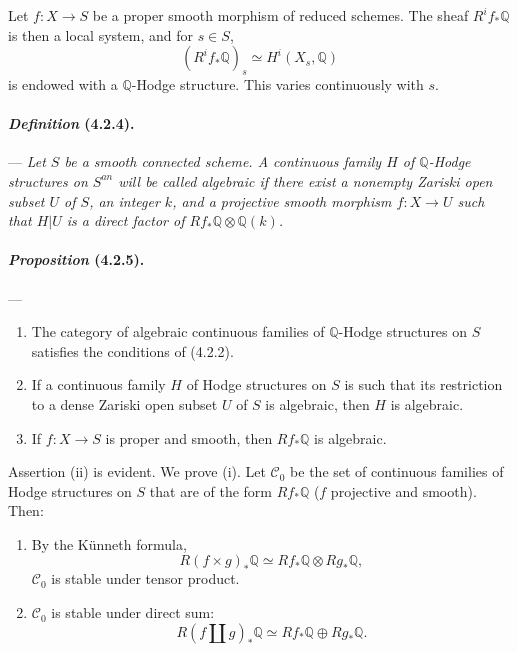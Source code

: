 \documentclass[10pt]{article}
\newcommand{\Q}{\mathbb Q}
\begin{document}
Let $f:X\to S$ be a proper smooth morphism of reduced schemes. The sheaf $R^if_*\Q$ is then a local system, and for $s\in S$,
\[
(R^if_*\Q)_s\simeq H^i(X_s,\Q)
\]
is endowed with a $\Q$-Hodge structure. This varies continuously with $s$.

\paragraph{\emph{Definition} (4.2.4).} --- {\itshape Let $S$ be a smooth connected scheme. A continuous family $H$ of $\Q$-Hodge structures on $S^{an}$ will be called algebraic if there exist a nonempty Zariski open subset $U$ of $S$, an integer $k$, and a projective smooth morphism $f:X\to U$ such that $H|U$ is a direct factor of $Rf_*\Q\otimes\Q(k)$.}

\paragraph{\emph{Proposition} (4.2.5).} --- {\itshape
\begin{enumerate}[label=(\roman*)]
\item The category of algebraic continuous families of $\Q$-Hodge structures on $S$ satisfies the conditions of (4.2.2).
\item If a continuous family $H$ of Hodge structures on $S$ is such that its restriction to a dense Zariski open subset $U$ of $S$ is algebraic, then $H$ is algebraic.
\item If $f:X\to S$ is proper and smooth, then $Rf_*\Q$ is algebraic.
\end{enumerate}}

Assertion (ii) is evident. We prove (i). Let $\mathcal C_0$ be the set of continuous families of Hodge structures on $S$ that are of the form $Rf_*\Q$ ($f$ projective and smooth). Then:
\begin{enumerate}[label=\alph*)]
\item By the Künneth formula,
\[
R(f\times g)_*\Q\simeq Rf_*\Q\otimes Rg_*\Q,
\]
$\mathcal C_0$ is stable under tensor product.
\item $\mathcal C_0$ is stable under direct sum:
\[
R(f\amalg g)_*\Q\simeq Rf_*\Q\oplus Rg_*\Q.
\]
\end{enumerate}
\end{document}
